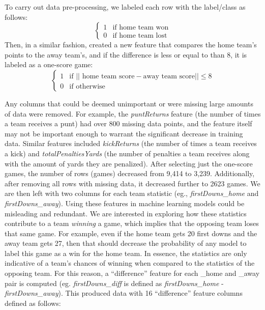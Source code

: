 \documentclass[10pt]{article}
\begin{document}
To carry out data pre-processing, we labeled each row with the label/class as follows:
\[ \begin{cases} 
      1 & \text{if home team won} \\
      0 & \text{if home team lost}
   \end{cases}
\]
Then, in a similar fashion, created a new feature that compares the home team's points to the away team's, and if the difference is less or equal to than 8, it is labeled as a one-score game:
\[ \begin{cases} 
      1 & \text{if }||\text{ home team score} - \text{away team score}|| \leq  8\\
      0 & \text{if otherwise}
   \end{cases}
\]

Any columns that could be deemed unimportant or were missing large amounts of data were removed. For example, the \textit{puntReturns} feature (the number of times a team receives a punt) had over 800 missing data points, and the feature itself may not be important enough to warrant the significant decrease in training data. Similar features included \textit{kickReturns} (the number of times a team receives a kick) and \textit{totalPenaltiesYards} (the number of penalties a team receives along with the amount of yards they are penalized). After selecting just the one-score games, the number of rows (games) decreased from 9,414 to 3,239. Additionally, after removing all rows with missing data, it decreased further to 2623 games. We are then left with two columns for each team statistic (eg., \textit{firstDowns\_home} and \textit{firstDowns\_away}). Using these features in machine learning models could be misleading and redundant. We are interested in exploring how these statistics contribute to a team \textit{winning} a game, which implies that the opposing team loses that same game. For example, even if the home team gets 20 first downs and the away team gets 27, then that should decrease the probability of any model to label this game as a win for the home team. In essence, the statistics are only indicative of a team's chances of winning when compared to the statistics of the opposing team. For this reason, a ``difference'' feature for each \_home and \_away pair is computed (eg. \textit{firstDowns\_diff} is defined as \textit{firstDowns\_home} - \textit{firstDowns\_away}). This produced data with 16 ``difference'' feature columns defined as follows:
\end{document}
